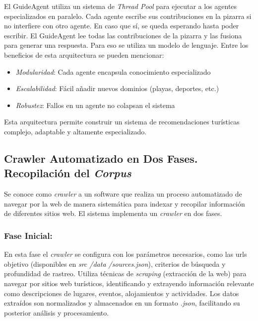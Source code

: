 \documentclass[10pt]{llncs}
\begin{document}
El GuideAgent utiliza un sistema de \textit{Thread Pool} para ejecutar a los agentes especializados en paralelo. 
Cada agente escribe sus contribuciones en la pizarra si no interfiere con otro agente. En caso que sí, se queda esperando hasta poder 
escribir. El GuideAgent lee todas las contribuciones de la pizarra y las fusiona para generar una respuesta. Para eso se utiliza un modelo 
de lenguaje.
Entre los beneficios de esta arquitectura se pueden mencionar:
\begin{itemize}
    \item \textit{Modularidad}: Cada agente encapsula conocimiento especializado
    \item \textit{Escalabilidad}: Fácil añadir nuevos dominios (playas, deportes, etc.)
    \item \textit{Robustez}: Fallos en un agente no colapsan el sistema
\end{itemize}

Esta arquitectura permite construir un sistema de recomendaciones turísticas complejo, adaptable y altamente especializado.

\vspace{\baselineskip}
\subsection{Crawler Automatizado en Dos Fases. Recopilación del \textit{Corpus}}

Se conoce como \textit{crawler} a un software que realiza un proceso automatizado de navegar por la web de manera sistemática para indexar y recopilar
información de diferentes sitios web. El sistema implementa un \textit{crawler} en dos fases.

\subsubsection{Fase Inicial:} En esta fase el \textit{crawler} se configura con los parámetros necesarios, como las urls objetivo (disponibles en \textit{src /data /sources.json}), 
criterios de búsqueda y profundidad de rastreo. Utiliza técnicas de \textit{scraping} (extracción de la web) para navegar por sitios web turísticos, identificando y extrayendo 
información relevante como descripciones de lugares, eventos, alojamientos y actividades. Los datos extraídos son normalizados y almacenados en un formato \textit{.json}, facilitando su posterior análisis y procesamiento.
\end{document}
